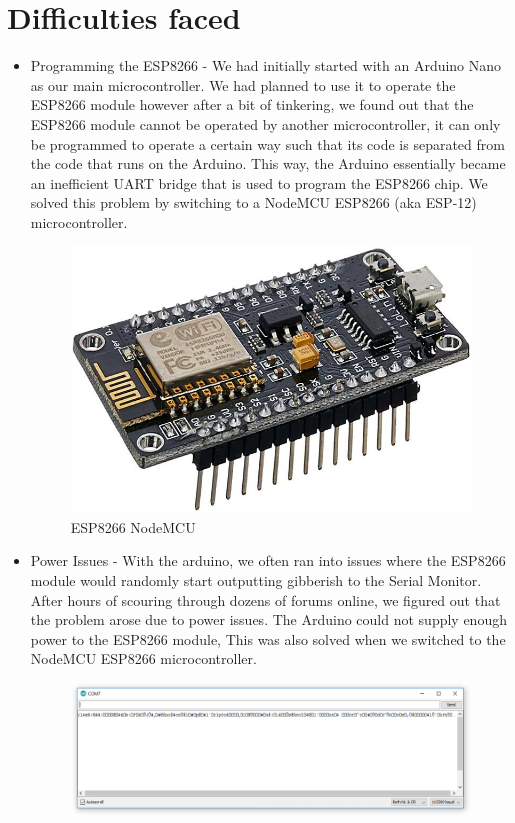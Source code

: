 \documentclass[12pt]{article}
\begin{document}
\section*{Difficulties faced}
 \normalsize
\begin{itemize}
\item Programming the ESP8266 - We had initially started with an Arduino Nano as our main microcontroller. We had planned to use it to operate the ESP8266 module however after a bit of tinkering, we found out that the ESP8266 module cannot be operated by another microcontroller, it can only be programmed to operate a certain way such that its code is separated from the code that runs on the Arduino. This way, the Arduino essentially became an inefficient UART bridge that is used to program the ESP8266 chip. We solved this problem by switching to a NodeMCU ESP8266 (aka ESP-12) microcontroller.
\begin{figure}[H]
\centering
    \includegraphics[scale=0.22]{node.jpg}
    \caption{ESP8266 NodeMCU}
\end{figure}
\item Power Issues - With the arduino, we often ran into issues where the ESP8266 module would randomly start outputting gibberish to the Serial Monitor. After hours of scouring through dozens of forums online, we figured out that the problem arose due to power issues. The Arduino could not supply enough power to the ESP8266 module, This was also solved when we switched to the NodeMCU ESP8266 microcontroller.
\begin{figure}[H]
\centering
    \includegraphics[scale=0.45]{serialgibb.png}

\end{figure}
\end{itemize}
\end{document}
